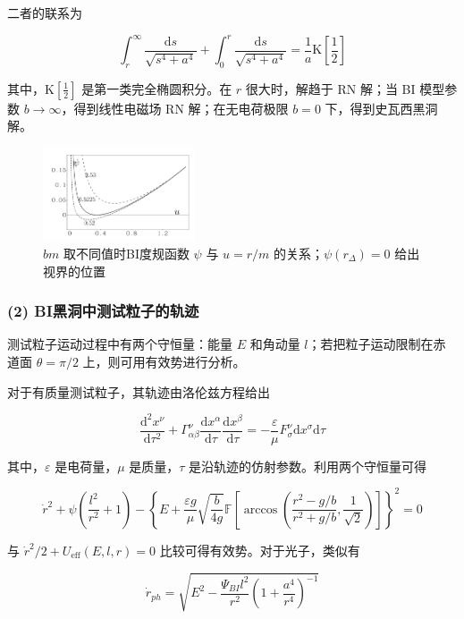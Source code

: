 \documentclass[aps,prl,preprint,groupedaddress,showkeys]{revtex4-2}
\begin{document}
二者的联系为

$$
\int_r ^{\infty} \frac{\mathrm{d}s }{\sqrt{s^4+a^4} } + \int_0^r \frac{\mathrm{d}s }{\sqrt{s^4+a^4} } 
=\frac{1 }{a } \mathrm{K}\left[\frac{1 }{2 }  \right] 
$$

其中，$\mathrm{K}\left[\frac{1 }{2 } \right]$ 是第一类完全椭圆积分。在 $r$ 很大时，解趋于 RN 解；当 BI 模型参数 $b\to\infty$，得到线性电磁场 RN 解；在无电荷极限 $b=0$ 下，得到史瓦西黑洞解。

\begin{figure}
    \centering
    \includegraphics[width=0.4\textwidth]{fig/fig6.png}
    \caption{$bm$ 取不同值时BI度规函数 $\psi$ 与 $u=r/m$ 的关系；$\psi(r_\Delta)=0$ 给出视界的位置}
\end{figure}

\subsubsection{(2) BI黑洞中测试粒子的轨迹}

测试粒子运动过程中有两个守恒量：能量 $E$ 和角动量 $l$；若把粒子运动限制在赤道面 $\theta=\pi/2$ 上，则可用有效势进行分析。

对于有质量测试粒子，其轨迹由洛伦兹方程给出

$$
\frac{\mathrm{d}^2 x^\nu }{\mathrm{d}\tau^2 } + \Gamma_{\alpha\beta}^\nu \frac{\mathrm{d}x^\alpha }{\mathrm{d}\tau } \frac{\mathrm{d}x^\beta }{\mathrm{d}\tau } 
=-\frac{\varepsilon }{\mu } F_{\sigma}^{\nu} \mathrm{d}x^\sigma \mathrm{d}\tau
$$

其中，$\varepsilon$ 是电荷量，$\mu$ 是质量，$\tau$ 是沿轨迹的仿射参数。利用两个守恒量可得

$$
\dot{r}^2 + \psi\left(\frac{l^2 }{r^2 } + 1 \right) - \left\{E+\frac{\varepsilon g }{\mu } \sqrt{\frac{b }{4g } } \mathbb{F} \left[\arccos\left(\frac{r^2-g/b }{r^2+g/b }  , \frac{1 }{\sqrt{2} }  \right) \right] \right\}^2=0
$$

与 $\dot{r}^2/2+U_{\mathrm{eff}}(E,l,r)=0$ 比较可得有效势。对于光子，类似有

$$
\dot{r}_{ph}
=\sqrt{E^2 - \frac{\Psi_{BI} l^2 }{r^2 } \left(1+\frac{a^4 }{r^4 }  \right)^{-1}} 
$$
\end{document}
